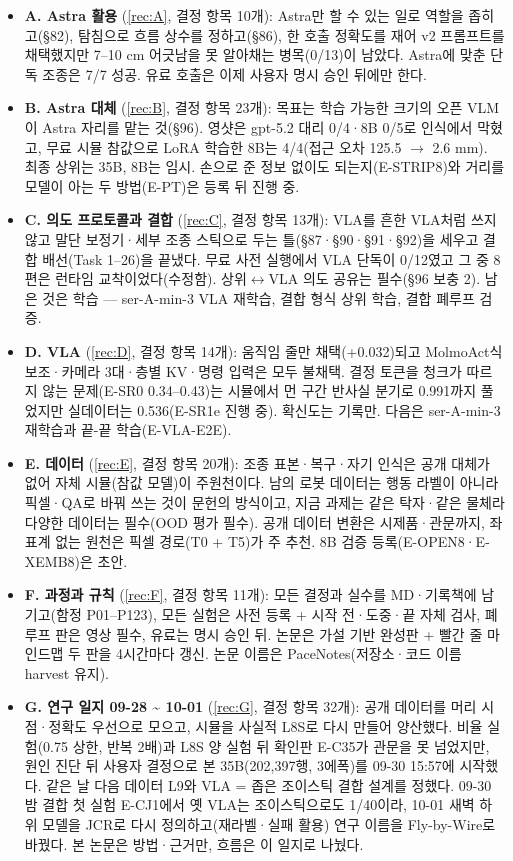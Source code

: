 \begin{itemize}
  \item \textbf{A. Astra 활용} (\ref{rec:A}, 결정 항목 10개): Astra만 할 수 있는 일로 역할을 좁히고(§82), 탐침으로 흐름 상수를 정하고(§86), 한 호출 정확도를 재어 v2 프롬프트를 채택했지만 7--10 cm 어긋남을 못 알아채는 병목(0/13)이 남았다. Astra에 맞춘 단독 조종은 7/7 성공. 유료 호출은 이제 사용자 명시 승인 뒤에만 한다.
  \item \textbf{B. Astra 대체} (\ref{rec:B}, 결정 항목 23개): 목표는 학습 가능한 크기의 오픈 VLM이 Astra 자리를 맡는 것(§96). 영샷은 gpt-5.2 대리 0/4·8B 0/5로 인식에서 막혔고, 무료 시뮬 참값으로 LoRA 학습한 8B는 4/4(접근 오차 125.5 $\rightarrow$ 2.6 mm). 최종 상위는 35B, 8B는 임시. 손으로 준 정보 없이도 되는지(E-STRIP8)와 거리를 모델이 아는 두 방법(E-PT)은 등록 뒤 진행 중.
  \item \textbf{C. 의도 프로토콜과 결합} (\ref{rec:C}, 결정 항목 13개): VLA를 흔한 VLA처럼 쓰지 않고 말단 보정기·세부 조종 스틱으로 두는 틀(§87·§90·§91·§92)을 세우고 결합 배선(Task 1--26)을 끝냈다. 무료 사전 실행에서 VLA 단독이 0/12였고 그 중 8편은 런타임 교착이었다(수정함). 상위$\leftrightarrow$VLA 의도 공유는 필수(§96 보충 2). 남은 것은 학습 --- ser-A-min-3 VLA 재학습, 결합 형식 상위 학습, 결합 폐루프 검증.
  \item \textbf{D. VLA} (\ref{rec:D}, 결정 항목 14개): 움직임 줄만 채택(+0.032)되고 MolmoAct식 보조·카메라 3대·층별 KV·명령 입력은 모두 불채택. 결정 토큰을 청크가 따르지 않는 문제(E-SR0 0.34--0.43)는 시뮬에서 먼 구간 반사실 분기로 0.991까지 풀었지만 실데이터는 0.536(E-SR1e 진행 중). 확신도는 기록만. 다음은 ser-A-min-3 재학습과 끝-끝 학습(E-VLA-E2E).
  \item \textbf{E. 데이터} (\ref{rec:E}, 결정 항목 20개): 조종 표본·복구·자기 인식은 공개 대체가 없어 자체 시뮬(참값 모델)이 주원천이다. 남의 로봇 데이터는 행동 라벨이 아니라 픽셀·QA로 바꿔 쓰는 것이 문헌의 방식이고, 지금 과제는 같은 탁자·같은 물체라 다양한 데이터는 필수(OOD 평가 필수). 공개 데이터 변환은 시제품·관문까지, 좌표계 없는 원천은 픽셀 경로(T0 + T5)가 주 추천. 8B 검증 등록(E-OPEN8·E-XEMB8)은 초안.
  \item \textbf{F. 과정과 규칙} (\ref{rec:F}, 결정 항목 11개): 모든 결정과 실수를 MD·기록책에 남기고(함정 P01--P123), 모든 실험은 사전 등록 + 시작 전·도중·끝 자체 검사, 폐루프 판은 영상 필수, 유료는 명시 승인 뒤. 논문은 가설 기반 완성판 + 빨간 줄 마인드맵 두 판을 4시간마다 갱신. 논문 이름은 PaceNotes(저장소·코드 이름 harvest 유지).
  \item \textbf{G. 연구 일지 09-28 \textasciitilde{} 10-01} (\ref{rec:G}, 결정 항목 32개): 공개 데이터를 머리 시점·정확도 우선으로 모으고, 시뮬을 사실적 L8S로 다시 만들어 양산했다. 비율 실험(0.75 상한, 반복 2배)과 L8S 양 실험 뒤 확인판 E-C35가 관문을 못 넘었지만, 원인 진단 뒤 사용자 결정으로 본 35B(202,397행, 3에폭)를 09-30 15:57에 시작했다. 같은 날 다음 데이터 L9와 VLA = 좁은 조이스틱 결합 설계를 정했다. 09-30 밤 결합 첫 실험 E-CJ1에서 옛 VLA는 조이스틱으로도 1/40이라, 10-01 새벽 하위 모델을 JCR로 다시 정의하고(재라벨·실패 활용) 연구 이름을 Fly-by-Wire로 바꿨다. 본 논문은 방법·근거만, 흐름은 이 일지로 나눴다.
\end{itemize}
